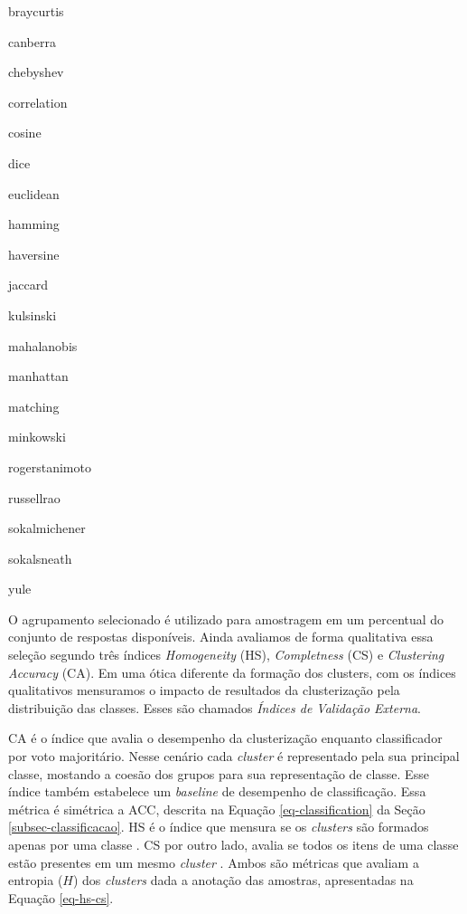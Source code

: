 \begin{itemize}
\begin{multicols}{4}
  \item braycurtis
  \item canberra
  \item chebyshev
  \item correlation
  \item cosine
  \item dice
  \item euclidean
  \item hamming
  \item haversine
  \item jaccard
  \item kulsinski
  \item mahalanobis
  \item manhattan
  \item matching
  \item minkowski
  \item rogerstanimoto
  \item russellrao
  \item sokalmichener
  \item sokalsneath
  \item yule
  \end{multicols}
\end{itemize}

O agrupamento selecionado é utilizado para amostragem em um percentual do conjunto de respostas disponíveis. Ainda avaliamos de forma qualitativa essa seleção segundo três índices \textit{Homogeneity} (HS), \textit{Completness} (CS) e \textit{Clustering Accuracy} (CA). Em uma ótica diferente da formação dos clusters, com os índices qualitativos mensuramos o impacto de resultados da clusterização pela distribuição das classes. Esses são chamados \textit{Índices de Validação Externa}.

CA é o índice que avalia o desempenho da clusterização enquanto classificador por voto majoritário. Nesse cenário cada \textit{cluster} é representado pela sua principal classe, mostando a coesão dos grupos para sua representação de classe. Esse índice também estabelece um \textit{baseline} de desempenho de classificação. Essa métrica é simétrica a ACC, descrita na Equação \ref{eq-classification} da Seção \ref{subsec-classificacao}. HS é o índice que mensura se os \textit{clusters} são formados apenas por uma classe \cite{rosenberg2007}. CS por outro lado, avalia se todos os itens de uma classe estão presentes em um mesmo \textit{cluster} \cite{rosenberg2007}. Ambos são métricas que avaliam a entropia ($H$) dos \textit{clusters} dada a anotação das amostras, apresentadas na Equação \ref{eq-hs-cs}.

